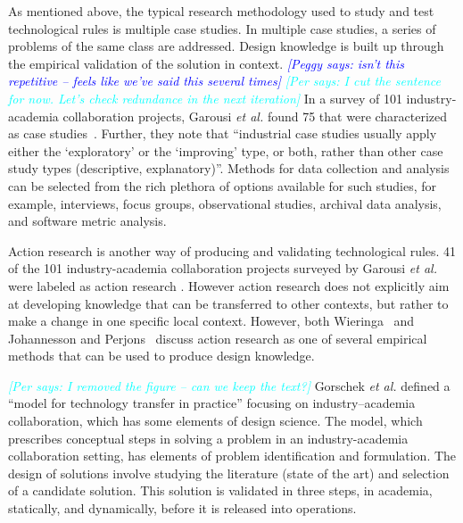 \documentclass[graybox]{svmult}
\newcommand{\peggy}[1]{\textcolor{blue}{{\it [Peggy says: #1]}}}
\newcommand{\per}[1]{\textcolor{cyan}{{\it [Per says: #1]}}}
\newcommand{\peggy}[1]{}
\newcommand{\per}[1]{}
\begin{document}
As mentioned above, the typical research methodology used to study and test technological rules is multiple case studies. In multiple case studies, a series of problems of the same class are addressed. Design knowledge is built up through the empirical validation of the solution in context. %
\peggy{isn't this repetitive -- feels like we've said this several times} \per{I cut the sentence for now. Let's check redundance in the next iteration}
In a survey of 101 industry-academia collaboration projects, Garousi \emph{et al.} found 75 that were characterized as case studies~\cite{Garousi2019}. Further, they note that ``industrial case studies usually apply either the `exploratory' or the `improving' type, or both, rather than other case study types (descriptive, explanatory)''. Methods for data collection and analysis can be selected from the rich plethora of options available for such studies, for example, interviews, focus groups, observational studies, archival data analysis, and software metric analysis. 


Action research is another way of producing and validating technological rules.  41 of the 101 industry-academia collaboration projects surveyed by Garousi \emph{et al.} were labeled as action research \cite{Garousi2019}. However action research does not explicitly aim at developing knowledge that can be transferred to other contexts, but rather to make a change in one specific local context. However, both Wieringa~\cite{wieringa_technical_2012} and Johannesson and Perjons~\cite{johannesson_introduction_2014} discuss action research as one of several empirical methods that can be used to produce design knowledge.



\per{I removed the figure -- can we keep the text?}
Gorschek \emph{et al.} defined a ``model for technology transfer in practice'' \cite{GorschekSW2006} focusing on industry--academia collaboration, which has some elements of design science. %
The model, which prescribes conceptual steps in solving a problem in an industry-academia collaboration setting, has elements of problem identification and formulation. The design of solutions involve studying the literature (state of the art) and selection of a candidate solution. This solution is validated in three steps, in academia, statically, and dynamically, before it is released into operations. 
\end{document}
